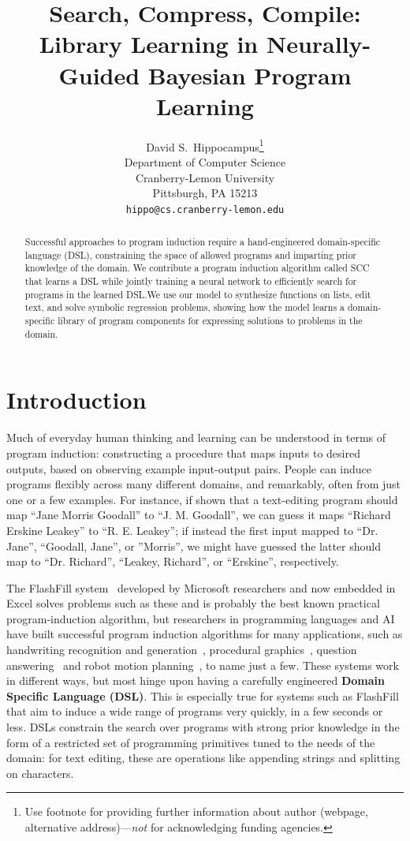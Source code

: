 \documentclass{article}
\title{Search, Compress, Compile: Library Learning in Neurally-Guided Bayesian Program Learning}
\author{
  David S.~Hippocampus\thanks{Use footnote for providing further
    information about author (webpage, alternative
    address)---\emph{not} for acknowledging funding agencies.} \\
  Department of Computer Science\\
  Cranberry-Lemon University\\
  Pittsburgh, PA 15213 \\
  \texttt{hippo@cs.cranberry-lemon.edu} \\
}
\newcommand{\system}{\textsc{SCC} }
\begin{document}

\maketitle

\begin{abstract}
  Successful approaches to program induction require a hand-engineered
  domain-specific language (DSL), constraining the space of allowed
  programs and imparting prior knowledge of the domain.  We contribute
  a program induction algorithm called \system that learns a DSL while
  jointly training a neural network to efficiently search for programs
  in the learned DSL.\@ We use our model to synthesize functions on lists,
  edit text, and solve symbolic regression problems, showing how the
  model learns a domain-specific library of program components for
  expressing solutions to problems in the domain.
\end{abstract}


\section{Introduction}

Much of everyday human thinking and learning can be understood in
terms of program induction: constructing a procedure that maps inputs
to desired outputs, based on observing example input-output pairs.
People can induce programs flexibly across many different domains, and
remarkably, often from just one or a few examples.  For instance, if
shown that a text-editing program should map ``Jane Morris Goodall''
to ``J. M. Goodall'', we can guess it maps ``Richard Erskine Leakey''
to ``R. E. Leakey''; if instead the first input mapped to
``Dr. Jane'', ``Goodall, Jane'', or ''Morris'', we might have guessed
the latter should map to ``Dr. Richard'', ``Leakey, Richard'', or
``Erskine'', respectively.

The FlashFill system~\cite{gulwani2011automating} developed by
Microsoft researchers and now embedded in Excel solves problems such
as these and is probably the best known practical program-induction
algorithm, but researchers in programming languages and AI have built
successful program induction algorithms for many applications, 
such as handwriting recognition and generation~\cite{lake2015human},
procedural graphics~\cite{ellis2017learning}, question
answering~\cite{johnson2017clevr} and robot motion
planning~\cite{devlin2017neural}, to name just a few.
These systems work in different ways, but most hinge upon having a
carefully engineered \textbf{Domain Specific Language (DSL)}.  This is
especially true for systems such as FlashFill that aim to induce a
wide range of programs very quickly, in a few seconds or less.  DSLs
constrain the search over programs with strong prior knowledge in the
form of a restricted set of programming primitives tuned to the needs
of the domain: for text editing, these are operations like appending
strings and splitting on characters.  
\end{document}
